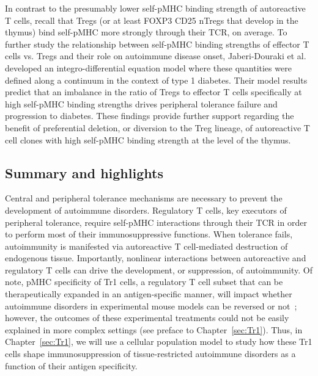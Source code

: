 In contrast to the presumably lower self-pMHC binding strength of autoreactive T cells, recall that Tregs (or at least FOXP3\pos{} CD25\pos{} nTregs that develop in the thymus) bind self-pMHC more strongly through their TCR, on average. To further study the relationship between self-pMHC binding strengths of effector T cells vs. Tregs and their role on autoimmune disease onset, Jaberi-Douraki et al.~\cite{jaberi2015continuum} developed an integro-differential equation model where these quantities were defined along a continuum in the context of type 1 diabetes. Their model results predict that an imbalance in the ratio of Tregs to effector T cells specifically at high self-pMHC binding strengths drives peripheral tolerance failure and progression to diabetes. These findings provide further support regarding the benefit of preferential deletion, or diversion to the Treg lineage, of autoreactive T cell clones with high self-pMHC binding strength at the level of the thymus.

\subsection{Summary and highlights}

Central and peripheral tolerance mechanisms are necessary to prevent the development of autoimmune disorders. Regulatory T cells, key executors of peripheral tolerance, require self-pMHC interactions through their TCR in order to perform most of their immunosuppressive functions. When tolerance fails, autoimmunity is manifested via autoreactive T cell-mediated destruction of endogenous tissue. Importantly, nonlinear interactions between autoreactive and regulatory T cells can drive the development, or suppression, of autoimmunity. Of note, pMHC specificity of Tr1 cells, a regulatory T cell subset that can be therapeutically expanded in an antigen-specific manner, will impact whether autoimmune disorders in experimental mouse models can be reversed or not~\cite{umeshappa2020ubiquitous}; however, the outcomes of these experimental treatments could not be easily explained in more complex settings (see preface to Chapter~\ref{sec:Tr1}). Thus, in Chapter~\ref{sec:Tr1}, we will use a cellular population model to study how these Tr1 cells shape immunosuppression of tissue-restricted autoimmune disorders as a function of their antigen specificity.



